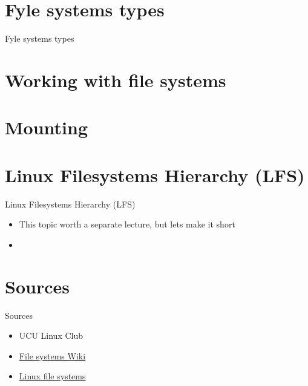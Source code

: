 \documentclass[usenames,dvipsnames,10pt,aspectratio=169]{beamer}
\begin{document}

\section{Fyle systems types}

\begin{frame}{Fyle systems types}

    

\end{frame}

\section{Working with file systems}

\section{Mounting}

\section{Linux Filesystems Hierarchy (LFS)}

\begin{frame}{Linux Filesystems Hierarchy (LFS)}
    \begin{itemize}
        \item This topic worth a separate lecture, but lets make it short 
        \item 
    \end{itemize}
\end{frame}


\section{Sources}
\begin{frame}{Sources}
    \begin{itemize}
        \item UCU Linux Club
        \item \href{https://en.wikipedia.org/wiki/File_system}{File systems Wiki}
        \item \href{https://www.javatpoint.com/linux-files}{Linux file systems}
    \end{itemize}
\end{frame}
\end{document}
